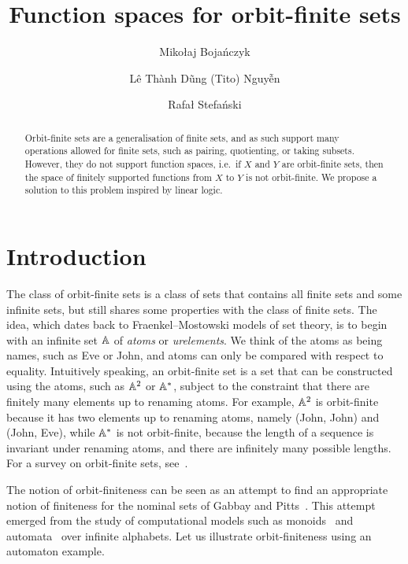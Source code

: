 \documentclass[a4paper,UKenglish,cleveref, autoref, numberwithinsect, thm-restate]{lipics-v2021}
\title{Function spaces for orbit-finite sets} %
\author{Mikołaj Bojańczyk}{University of Warsaw, Poland \and \url{https://www.mimuw.edu.pl/~bojan/}}{bojan@mimuw.edu.pl}{}{Supported by Polish NCN Maestro Grant 2022/46/A/ST6/00072}%
\author{Lê Thành Dũng (Tito) Nguy\~{\^{e}}n}{École normale supérieure de Lyon, France \and \url{https://nguyentito.eu/}}{nltd@nguyentito.eu}{https://orcid.org/0000-0002-6900-5577}{Supported by the LABEX MILYON (ANR-10-LABX-0070) of Université de Lyon, within the program ``France 2030'' (ANR-11-IDEX-0007) operated by the French National Research Agency (ANR).}
\author{Rafał Stefański}{University of Warsaw, Poland}{rafal.stefanski@mimuw.edu.pl}{}{Supported by EPSRC project EP/V040944/1 ``Resources in Computation''. }%
\begin{document}
\newcommand{\loli}{\multimap}


\maketitle 
\begin{abstract}
    Orbit-finite sets are a generalisation of finite sets, and as such support many operations allowed for finite sets, such as pairing, quotienting, or taking subsets. However, they do not support function spaces, i.e.~if $X$ and $Y$ are orbit-finite sets, then the space of finitely supported functions from $X$ to $Y$ is not orbit-finite. We propose a solution to this problem inspired by linear logic.
\end{abstract}

\section{Introduction}
The class of orbit-finite sets is a class of sets that contains all finite sets and some infinite sets, but still shares some properties with the class of finite sets.  The idea, which dates back to Fraenkel--Mostowski models of set theory,  is to begin with an infinite set $\mathbb A$ of \emph{atoms} or \emph{urelements}. We think of the atoms as being names, such as Eve or John, and atoms can only be compared with respect to equality. Intuitively speaking, an  orbit-finite set is a set  that can be constructed using the atoms, such as $\mathbb A^2$ or $\mathbb A^*$, subject to the constraint that there are finitely many elements up to  renaming atoms. For example, $\mathbb A^2$ is orbit-finite because it has two elements up to renaming atoms, namely (John, John) and (John, Eve), while $\mathbb A^*$ is not orbit-finite, because the length of a sequence is invariant under renaming atoms, and there are infinitely many possible lengths. For a survey on orbit-finite sets, see~\cite{bojanczyk_slightly2018}.

The notion of orbit-finiteness can be seen as an attempt to find an appropriate notion of finiteness for the  nominal sets of Gabbay and Pitts~\cite{PittsAM:nomsns}.  This attempt emerged from the study of computational models such as monoids~\cite{bojanczykNominalMonoids2013} and automata~\cite{bojanczykAutomataTheoryNominal2014} over infinite alphabets. Let us illustrate orbit-finiteness using an automaton example. 
\end{document}
